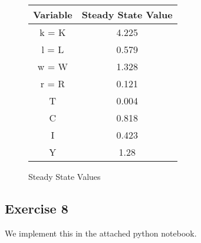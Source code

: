 \documentclass{article}
\begin{document}
	\begin{figure}[!h]
		\centering
		\caption{Steady State Values}
		\begin{tabular}{c | c}
			Variable & Steady State Value\\
			\hline
			k = K & 4.225\\
			l = L& 0.579\\
			w = W & 1.328 \\
			r = R & 0.121 \\
			T & 0.004 \\
			C & 0.818 \\
			I & 0.423 \\
			Y & 1.28  \\
			\hline
		\end{tabular}
	\end{figure}
	
	\subsection*{Exercise 8}
	We implement this in the attached python notebook.
	
\end{document}
